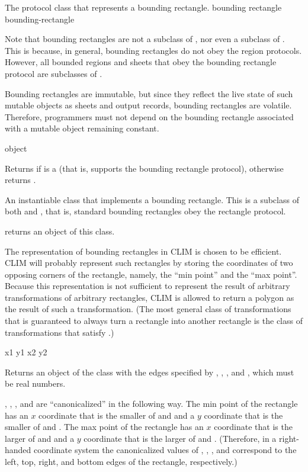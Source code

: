 
The protocol class that represents a bounding rectangle.
 {bounding rectangle} {bounding-rectangle}

Note that bounding rectangles are not a subclass of , nor even a
subclass of .  This is because, in general, bounding rectangles do
not obey the region protocols.  However, all bounded regions and sheets that
obey the bounding rectangle protocol are subclasses of .

Bounding rectangles are immutable, but since they reflect the live state of such
mutable objects as sheets and output records, bounding rectangles are volatile.
Therefore, programmers must not depend on the bounding rectangle associated with
a mutable object remaining constant.

 {object}

Returns  if  is a  (that is,
supports the bounding rectangle protocol), otherwise returns .


An instantiable class that implements a bounding rectangle.  This is a subclass
of both  and , that is, standard bounding
rectangles obey the rectangle protocol.

 returns an object of this class.

The representation of bounding rectangles in CLIM is chosen to be efficient.
CLIM will probably represent such rectangles by storing the coordinates of two
opposing corners of the rectangle, namely, the ``min point'' and the ``max
point''.  Because this representation is not sufficient to represent the result
of arbitrary transformations of arbitrary rectangles, CLIM is allowed to return
a polygon as the result of such a transformation.  (The most general class of
transformations that is guaranteed to always turn a rectangle into another
rectangle is the class of transformations that satisfy
.)

 {x1 y1 x2 y2}

Returns an object of the class  with the edges
specified by , , , and , which must be real
numbers.

, , , and  are ``canonicalized'' in the
following way.  The min point of the rectangle has an $x$ coordinate that is the
smaller of  and  and a $y$ coordinate that is the smaller of
 and .  The max point of the rectangle has an $x$ coordinate
that is the larger of  and  and a $y$ coordinate that is the
larger of  and .  (Therefore, in a right-handed coordinate
system the canonicalized values of , , , and 
correspond to the left, top, right, and bottom edges of the rectangle,
respectively.)

